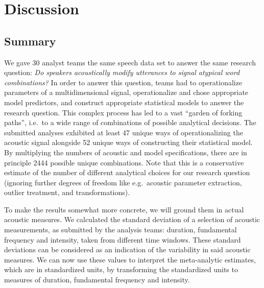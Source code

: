 \documentclass[Review,times,sageh]{sagej}
\begin{document}
\hypertarget{discussion}{%
\section{Discussion}\label{discussion}}

\hypertarget{summary}{%
\subsection{Summary}\label{summary}}

We gave 30 analyst teams the same speech data set to answer the same research question: \emph{Do
speakers acoustically modify utterances to signal atypical word combinations?}
In order to answer this question, teams had to operationalize parameters of a multidimensional signal, operationalize and chose appropriate model predictors, and construct appropriate statistical models to answer the research question.
This complex process has led to a vast ``garden of forking paths'', i.e.~to a wide range of combinations of possible analytical decisions.
The submitted analyses exhibited at least 47 unique ways of operationalizing the acoustic signal alongside 52 unique ways of constructing their statistical model.
By multiplying the numbers of acoustic and model specifications, there are in principle 2444 possible unique combinations.
Note that this is a conservative estimate of the number of different analytical choices for our research question (ignoring further degrees of freedom like e.g.~acoustic parameter extraction, outlier treatment, and transformations).

To make the results somewhat more concrete, we will ground them in actual acoustic measures.
We calculated the standard deviation of a selection of acoustic measurements, as submitted by the analysis teams: duration, fundamental frequency and intensity, taken from different time windows.
These standard deviations can be considered as an indication of the variability in said acoustic measures.
We can now use these values to interpret the meta-analytic estimates, which are in standardized units, by transforming the standardized units to measures of duration, fundamental frequency and intensity.
\end{document}
